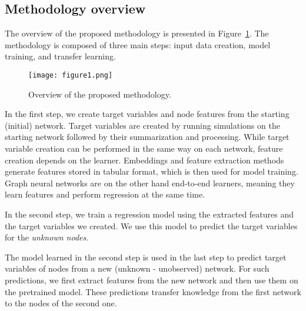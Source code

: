 \documentclass{article}
\begin{document}
\subsection{Methodology overview}
The overview of the proposed methodology is presented in Figure~\ref{fig:overview}. The methodology is composed of three main steps: input data creation, model training, and transfer learning. 

\begin{figure}[b!]
  \centering
  \texttt{[image: figure1.png]}
  \caption{Overview of the proposed methodology.}
  \label{fig:overview}
\end{figure}

In the first step, we create target variables and node features from the starting (initial) network. Target variables are created by running simulations on the starting network followed by their summarization and processing. While target variable creation can be performed in the same way on each network, feature creation depends on the learner. Embeddings and feature extraction methods generate features stored in tabular format, which is then used for model training. Graph neural networks are on the other hand end-to-end learners, meaning they learn features and perform regression at the same time.

In the second step, we train a regression model using the extracted features and the target variables we created. We use this model to predict the target variables for the \emph{unknown nodes}. 

The model learned in the second step is used in the last step to predict target variables of nodes from a new (unknown - unobserved) network. For such predictions, we first extract features from the new network and then use them on the pretrained model. These predictions transfer knowledge from the first network to the nodes of the second one.
\end{document}
